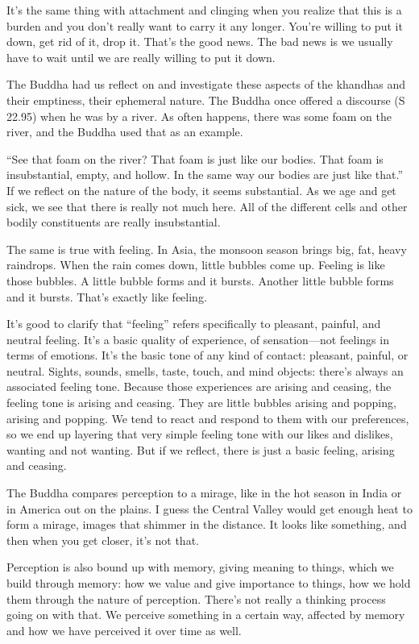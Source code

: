 It’s the same thing with attachment and clinging when you realize that
this is a burden and you don’t really want to carry it any longer.
You’re willing to put it down, get rid of it, drop it. That’s the good
news. The bad news is we usually have to wait until we are really
willing to put it down.

The Buddha had us reflect on and investigate these aspects of the
khandhas and their emptiness, their ephemeral nature. The Buddha once
offered a discourse (S 22.95) when he was by a river. As often happens,
there was some foam on the river, and the Buddha used that as an
example.

“See that foam on the river? That foam is just like our bodies. That
foam is insubstantial, empty, and hollow. In the same way our bodies are
just like that.” If we reflect on the nature of the body, it seems
substantial. As we age and get sick, we see that there is really not
much here. All of the different cells and other bodily constituents are
really insubstantial.

The same is true with feeling. In Asia, the monsoon season brings big,
fat, heavy raindrops. When the rain comes down, little bubbles come up.
Feeling is like those bubbles. A little bubble forms and it bursts.
Another little bubble forms and it bursts. That’s exactly like feeling.

It’s good to clarify that “feeling” refers specifically to pleasant,
painful, and neutral feeling. It’s a basic quality of experience, of
sensation—not feelings in terms of emotions. It’s the basic tone of any
kind of contact: pleasant, painful, or neutral. Sights, sounds, smells,
taste, touch, and mind objects: there’s always an associated feeling
tone. Because those experiences are arising and ceasing, the feeling
tone is arising and ceasing. They are little bubbles arising and
popping, arising and popping. We tend to react and respond to them with
our preferences, so we end up layering that very simple feeling tone
with our likes and dislikes, wanting and not wanting. But if we reflect,
there is just a basic feeling, arising and ceasing.

The Buddha compares perception to a mirage, like in the hot season in
India or in America out on the plains. I guess the Central Valley would
get enough heat to form a mirage, images that shimmer in the distance.
It looks like something, and then when you get closer, it’s not that.

Perception is also bound up with memory, giving meaning to things, which
we build through memory: how we value and give importance to things, how
we hold them through the nature of perception. There’s not really a
thinking process going on with that. We perceive something in a certain
way, affected by memory and how we have perceived it over time as well.

